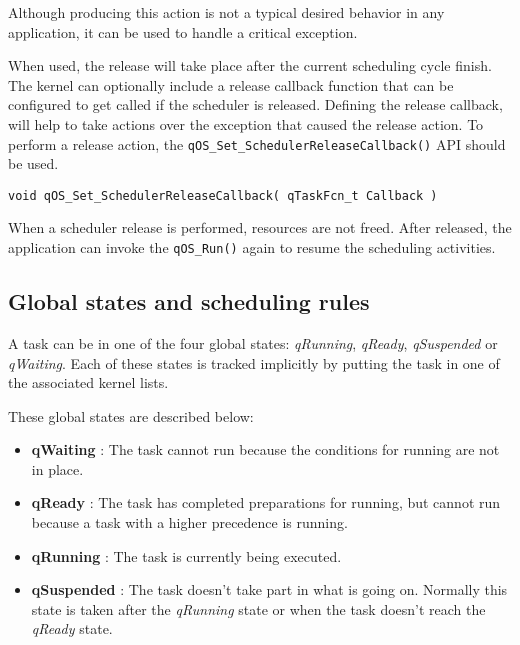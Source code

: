 Although producing this action is not a typical desired behavior in any application, it can be used to handle a critical exception.

When used, the release will take place after the current scheduling cycle finish. The kernel can optionally include a release callback function that can be configured to get called if the scheduler is released. 
Defining the release callback,  will help to take actions over the exception that caused the release action. To perform a release action, the \lstinline{qOS_Set_SchedulerReleaseCallback()}  API should be used. 
\medskip

\begin{lstlisting}[style=CStyle]
void qOS_Set_SchedulerReleaseCallback( qTaskFcn_t Callback )
\end{lstlisting}

\begin{tcolorbox}
\HandRight When a scheduler release is performed, resources are not freed. After released, the application can invoke the \lstinline{qOS_Run()} again to resume the scheduling activities.
\end{tcolorbox}

\subsection{Global states and scheduling rules}

A task can be in one of the four global states: \textit{qRunning}, \textit{qReady}, \textit{qSuspended} or \textit{qWaiting}. Each of these states is tracked implicitly by putting the task in one of the associated kernel lists. 

These global states are described below:



\begin{itemize}
    \item \textbf{qWaiting} : The task cannot run because the conditions for running are not in place. 
    \item \textbf{qReady} : The task has completed preparations for running, but cannot run because a task with a higher precedence is running.
    \item \textbf{qRunning} : The task is currently being executed.
    \item \textbf{qSuspended} : The task doesn't take part in what is going on. Normally this state is taken after the \textit{qRunning} state or when the task doesn't reach the \textit{qReady} state.
\end{itemize}


